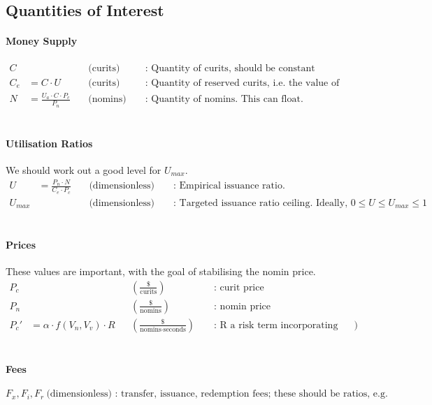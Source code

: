 \documentclass{article}
\begin{document}
\subsection{Quantities of Interest}
\paragraph{Money Supply}
\begin{align*}
    C & \ && \text{(curits)} && \text{ : Quantity of curits, should be constant} \\
    C_e &= C \cdot U \ && \text{(curits)} && \text{ : Quantity of reserved curits, i.e. the value of tokens have been issued against } \\
    N &= \frac{U_a \cdot C \cdot P_c}{P_n} \ && \text{(nomins)} && \text{ : Quantity of nomins. This can float.}
\end{align*}
\\

\paragraph{Utilisation Ratios} We should work out a good level for \(U_{max}\).
\begin{align*}
    U &= \frac{P_n \cdot N}{C_e \cdot P_c} \ && \text{(dimensionless)} && \text{ : Empirical issuance ratio. } \\
    U_{max} & \ && \text{(dimensionless)} && \text{ : Targeted issuance ratio ceiling. Ideally, } 0 \leq U \leq U_{max} \leq 1
\end{align*}
\\

\paragraph{Prices} These values are important, with the goal of stabilising the nomin price.
\begin{align*}
    P_c & \ && (\frac{\text{\$}}{\text{curits}}) && \text{ : curit price} \\
    P_n & \ && (\frac{\text{\$}}{\text{nomins}}) && \text{ : nomin price} \\
    P_c' &= \alpha \cdot f(V_n, V_v) \cdot R && (\frac{\text{\$}}{\text{nomins} \cdot \text{seconds}}) && \text{ : R a risk term incorporating volatility? \#buyers - \#sellers?})
\end{align*}
\\

\paragraph{Fees}
\[F_x, F_i, F_r \ \text{(dimensionless) : transfer, issuance, redemption fees; these should be ratios, e.g. 0.1\%}\]
\\
\end{document}
